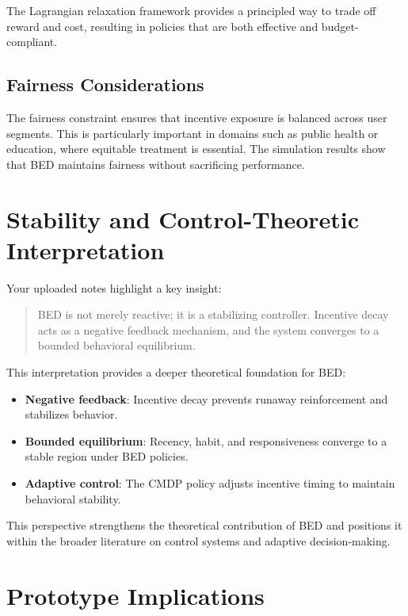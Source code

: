 The Lagrangian relaxation framework provides a principled way to trade off
reward and cost, resulting in policies that are both effective and
budget-compliant.

\subsection{Fairness Considerations}

The fairness constraint ensures that incentive exposure is balanced across user
segments. This is particularly important in domains such as public health or
education, where equitable treatment is essential. The simulation results show
that BED maintains fairness without sacrificing performance.

\section{Stability and Control-Theoretic Interpretation}

Your uploaded notes highlight a key insight:

\begin{quote}
BED is not merely reactive; it is a stabilizing controller. Incentive decay acts
as a negative feedback mechanism, and the system converges to a bounded
behavioral equilibrium.
\end{quote}

This interpretation provides a deeper theoretical foundation for BED:

\begin{itemize}
    \item \textbf{Negative feedback}: Incentive decay prevents runaway
    reinforcement and stabilizes behavior.
    \item \textbf{Bounded equilibrium}: Recency, habit, and responsiveness
    converge to a stable region under BED policies.
    \item \textbf{Adaptive control}: The CMDP policy adjusts incentive timing to
    maintain behavioral stability.
\end{itemize}

This perspective strengthens the theoretical contribution of BED and positions
it within the broader literature on control systems and adaptive decision-making.

\section{Prototype Implications}

